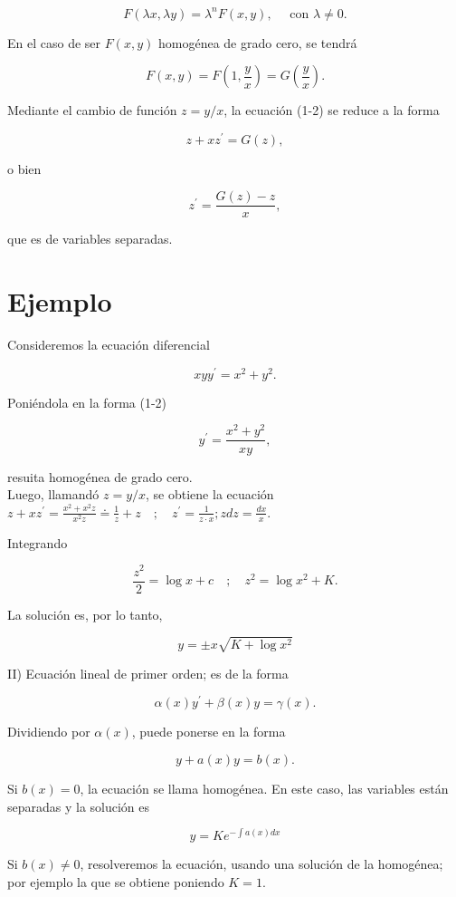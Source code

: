 \documentclass[10pt]{article}
\theoremstyle{plain}
\theoremstyle{definition}
\theoremstyle{remark}
\begin{document}
$$
F(\lambda x, \lambda y)=\lambda^{n} F(x, y), \quad \text { con } \lambda \neq 0 .
$$

En el caso de ser $F(x, y)$ homogénea de grado cero, se tendrá

$$
F(x, y)=F\left(1, \frac{y}{x}\right)=G\left(\frac{y}{x}\right) .
$$

Mediante el cambio de función $z=y / x$, la ecuación (1-2) se reduce a la forma

$$
z+x z^{\prime}=G(z),
$$

o bien

$$
z^{\prime}=\frac{G(z)-z}{x},
$$

que es de variables separadas.

\section*{Ejemplo}
Consideremos la ecuación diferencial

$$
x y y^{\prime}=x^{2}+y^{2} .
$$

Poniéndola en la forma (1-2)

$$
y^{\prime}=\frac{x^{2}+y^{2}}{x y},
$$

resuita homogénea de grado cero.\\
Luego, llamandó $z=y / x$, se obtiene la ecuación\\
$z+x z^{\prime}=\frac{x^{2}+x^{2} z}{x^{2} z} \doteq \frac{1}{z}+z \quad ; \quad z^{\prime}=\frac{1}{z \cdot x} ; z d z=\frac{d x}{x}$.

Integrando

$$
\frac{z^{2}}{2}=\log x+c \quad ; \quad z^{2}=\log x^{2}+K .
$$

La solución es, por lo tanto,

$$
y= \pm x \sqrt{K+\log x^{2}}
$$

II) Ecuación lineal de primer orden; es de la forma

$$
\alpha(x) y^{\prime}+\beta(x) y=\gamma(x) .
$$

Dividiendo por $\alpha(x)$, puede ponerse en la forma


\begin{equation*}
y+a(x) y=b(x) . \tag{4-2}
\end{equation*}


Si $b(x)=0$, la ecuación se llama homogénea. En este caso, las variables están separadas y la solución es

$$
y=K e^{-\int a(x) d x}
$$


Si $b(x) \neq 0$, resolveremos la ecuación, usando una solución de la homogénea; por ejemplo la que se obtiene poniendo $K=1$.
\end{document}
